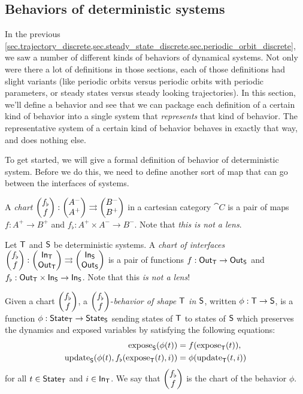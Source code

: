 \documentclass[DynamicalBook]{subfiles}
\begin{document}
{%
\subsection{Behaviors of deterministic systems}\label{sec.behaviors}

In the previous
\cref{sec.trajectory_discrete,sec.steady_state_discrete,sec.periodic_orbit_discrete},
we saw a number of different kinds of behaviors of dynamical systems. Not only
were there a lot of definitions in those sections, each of those definitions had
slight variants (like periodic orbits versus periodic orbits with periodic
parameters, or steady states versus steady looking trajectories). In this
section, we'll define a behavior and see that we can package each definition of a certain kind of
behavior into a single system that \emph{represents} that kind of
behavior. The representative system of a certain kind of behavior behaves in
exactly that way, and does nothing else.

To get started, we will give a formal definition of behavior of deterministic
system. Before we do this, we need to define another sort of map that can go
between the interfaces of systems.
\begin{definition}\label{def.chart_discrete}
  A \emph{chart} $\begin{pmatrix}{f_{\flat}} \\ {f} \end{pmatrix} : \begin{pmatrix}{A^-} \\ {A^+} \end{pmatrix} \rightrightarrows
  \begin{pmatrix}{B^-} \\ {B^+} \end{pmatrix}$ in a cartesian category $\cat{C}$ is a pair of maps $f : A^+ \to B^+$ and $f_{\flat} : A^+
  \times A^- \to B^-$. Note that \emph{this is not a lens}.

 
\end{definition}

\begin{definition} \label{def.behavior_discrete}
  Let $\mathsf{T}$ and $\mathsf{S}$ be deterministic systems. A \emph{chart
    of interfaces} $\begin{pmatrix}{f_{\flat}} \\ {f} \end{pmatrix} :
  \begin{pmatrix}{\mathsf{In}_{\mathsf{T}}} \\ {\mathsf{Out}_{\mathsf{T}}} \end{pmatrix} \rightrightarrows \begin{pmatrix}{\mathsf{In}_{\mathsf{S}}} \\ {\mathsf{Out}_{\mathsf{S}}} \end{pmatrix}$ is a pair of
  functions $f : \mathsf{Out}_{\mathsf{T}} \to \mathsf{Out}_{\mathsf{S}}$ and $f_{\flat} : \mathsf{Out}_{\mathsf{T}} \times \mathsf{In}_{\mathsf{S}} \to
  \mathsf{In}_{\mathsf{S}}$. Note that this \emph{is not a lens}!

  Given a chart $\begin{pmatrix}{f_{\flat}} \\ {f} \end{pmatrix}$, a $\begin{pmatrix}{f_{\flat}} \\ {f} \end{pmatrix}$-\emph{behavior of
  shape $\mathsf{T}$ in $\mathsf{S}$}, written
 $\phi :
\mathsf{T} \to \mathsf{S}$, is a function $\phi : \mathsf{State}_{\mathsf{T}} \to \mathsf{State}_{\mathsf{S}}$ sending
states of $\mathsf{T}$ to states of $\mathsf{S}$ which preserves the dynamics and
exposed variables by satisfying the following equations:
\begin{equation}\label{eqn.behavior_discrete}
\begin{aligned}
  \mathrm{expose}_{\mathsf{S}}(\phi(t)) &= f(\mathrm{expose}_{\mathsf{T}}(t)), \\
  \mathrm{update}_{\mathsf{S}}(\phi(t), f_{\flat}(\mathrm{expose}_{\mathsf{T}}(t), i)) &= \phi(\mathrm{update}_{\mathsf{T}}(t, i))
\end{aligned}
\end{equation}
for all $t \in \mathsf{State}_{\mathsf{T}}$ and $i \in \mathsf{In}_{\mathsf{T}}$. We say that $\begin{pmatrix}{f_{\flat}} \\ {f} \end{pmatrix}$
is the chart of the behavior $\phi$.
\end{definition}

}
\end{document}
